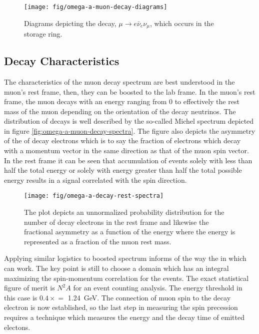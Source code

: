 \begin{figure}
\label{fig:omega-a-muon-decay-diagrams}
\texttt{[image: fig/omega-a-muon-decay-diagrams]}
\caption{Diagrams depicting the decay, $\mu \rightarrow e \bar{\nu}_e \nu_\mu$, which occurs in the \gmtwo storage ring.}
\end{figure}

\subsection{Decay Characteristics}

The characteristics of the muon decay spectrum are best understood in the muon's rest frame, then, they can be boosted to the lab frame.  In the muon's rest frame, the muon decays with an energy ranging from 0 to effectively the rest mass of the muon depending on the orientation of the decay neutrinos.  The distribution of decays is well described by the so-called Michel spectrum depicted in figure \ref{fig:omega-a-muon-decay-spectra}.  The figure also depicts the asymmetry of the of decay electrons which is to say the fraction of electrons which decay with a momentum vector in the same direction as that of the muon spin vector.  In the rest frame it can be seen that accumulation of events solely with less than half the total energy or solely with energy greater than half the total possible energy results in a signal correlated with the spin direction. \cite{e821-prd}

\begin{figure}
\label{fig:omega-a-decay-rest-spectra}
\texttt{[image: fig/omega-a-decay-rest-spectra]}
\caption{The plot depicts an unnormalized probability distribution for the number of decay electrons in the rest frame and likewise the fractional asymmetry as a function of the energy where the energy is represented as a fraction of the muon rest mass.}
\end{figure}

Applying similar logistics to boosted spectrum informs of the way the in which \gmtwo can work.  The key point is still to choose a domain which has an integral maximizing the spin-momentum correlation for the events.  The exact statistical figure of merit is $N^2A$ for an event counting analysis.  The energy threshold in this case is $0.4\times$\pmagic$ = $ \SI{1.24}{\GeV}.  The connection of muon spin to the decay electron is now established, so the last step in measuring the spin precession requires a technique which measures the energy and the decay time of emitted electons. \cite{e821-prd}

